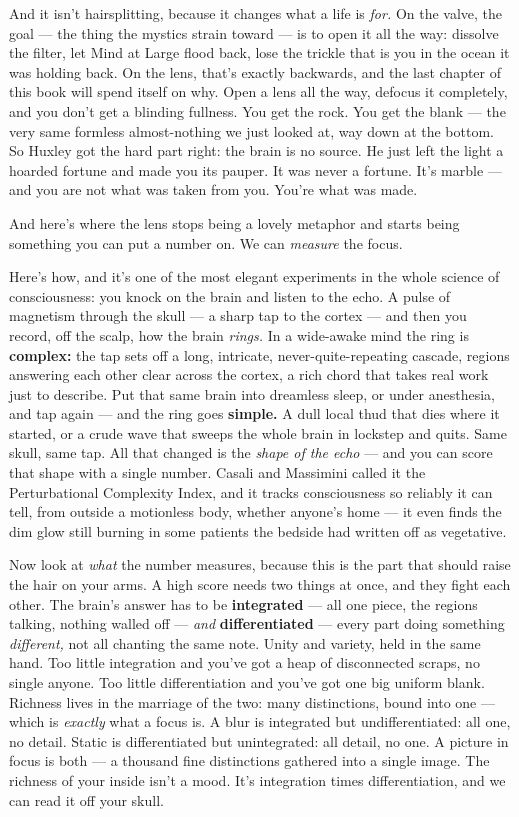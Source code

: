 \documentclass[11pt,openany]{book}
\begin{document}
And it isn’t hairsplitting, because it changes what a life is \textit{for.} On the valve, the goal — the thing the mystics strain toward — is to open it all the way: dissolve the filter, let Mind at Large flood back, lose the trickle that is you in the ocean it was holding back. On the lens, that’s exactly backwards, and the last chapter of this book will spend itself on why. Open a lens all the way, defocus it completely, and you don’t get a blinding fullness. You get the rock. You get the blank — the very same formless almost-nothing we just looked at, way down at the bottom. So Huxley got the hard part right: the brain is no source. He just left the light a hoarded fortune and made you its pauper. It was never a fortune. It’s marble — and you are not what was taken from you. You’re what was made.

And here’s where the lens stops being a lovely metaphor and starts being something you can put a number on. We can \textit{measure} the focus.

Here’s how, and it’s one of the most elegant experiments in the whole science of consciousness: you knock on the brain and listen to the echo. A pulse of magnetism through the skull — a sharp tap to the cortex — and then you record, off the scalp, how the brain \textit{rings.} In a wide-awake mind the ring is \textbf{complex:} the tap sets off a long, intricate, never-quite-repeating cascade, regions answering each other clear across the cortex, a rich chord that takes real work just to describe. Put that same brain into dreamless sleep, or under anesthesia, and tap again — and the ring goes \textbf{simple.} A dull local thud that dies where it started, or a crude wave that sweeps the whole brain in lockstep and quits. Same skull, same tap. All that changed is the \textit{shape of the echo} — and you can score that shape with a single number. Casali and Massimini called it the Perturbational Complexity Index, and it tracks consciousness so reliably it can tell, from outside a motionless body, whether anyone’s home — it even finds the dim glow still burning in some patients the bedside had written off as vegetative.

Now look at \textit{what} the number measures, because this is the part that should raise the hair on your arms. A high score needs two things at once, and they fight each other. The brain’s answer has to be \textbf{integrated} — all one piece, the regions talking, nothing walled off — \textit{and} \textbf{differentiated} — every part doing something \textit{different,} not all chanting the same note. Unity and variety, held in the same hand. Too little integration and you’ve got a heap of disconnected scraps, no single anyone. Too little differentiation and you’ve got one big uniform blank. Richness lives in the marriage of the two: many distinctions, bound into one — which is \textit{exactly} what a focus is. A blur is integrated but undifferentiated: all one, no detail. Static is differentiated but unintegrated: all detail, no one. A picture in focus is both — a thousand fine distinctions gathered into a single image. The richness of your inside isn’t a mood. It’s integration times differentiation, and we can read it off your skull.
\end{document}

